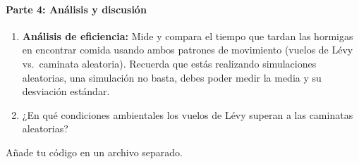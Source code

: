 \begin{ejercicio}[Tipo 2]
\paragraph{Parte 4: Análisis y discusión}
\begin{enumerate}
  \item \textbf{Análisis de eficiencia:} Mide y compara el tiempo que tardan
    las hormigas en encontrar comida usando ambos patrones de movimiento (vuelos
    de Lévy vs.\ caminata aleatoria). Recuerda que estás realizando simulaciones
    aleatorias, una simulación no basta, debes poder medir la media y su
    desviación estándar.
  \item ¿En qué condiciones ambientales los vuelos de Lévy superan a las
    caminatas aleatorias?
\end{enumerate}
Añade tu código en un archivo separado.
\end{ejercicio}

